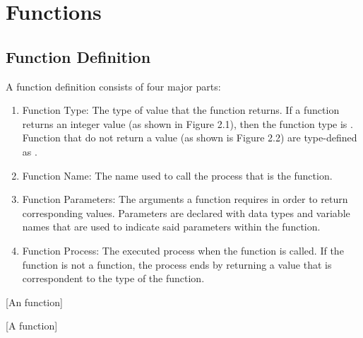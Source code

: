 \chapter{Functions}

\section{Function Definition}
A function definition consists of four major parts:
\begin{enumerate}
\item Function Type: The type of value that the function returns. If a function
    returns an integer value (as shown in Figure 2.1), then the function type is
    . Function that do not return a value (as shown is Figure 2.2) are
    type-defined as .
\item Function Name: The name used to call the process that is the function.
\item Function Parameters: The arguments a function requires in order to return
    corresponding values. Parameters are declared with data types and variable
    names that are used to indicate said parameters within the function.
\item Function Process: The executed process when the function is called. If the
    function is not a  function, the process ends by returning a value
    that is correspondent to the type of the function.
\end{enumerate}
\begin{minipage}{.5\textwidth}
\begingroup
{}[An  function]
\endgroup
\end{minipage}
\begin{minipage}{.5\textwidth}
\begingroup
{}[A  function]
\endgroup
\end{minipage}


